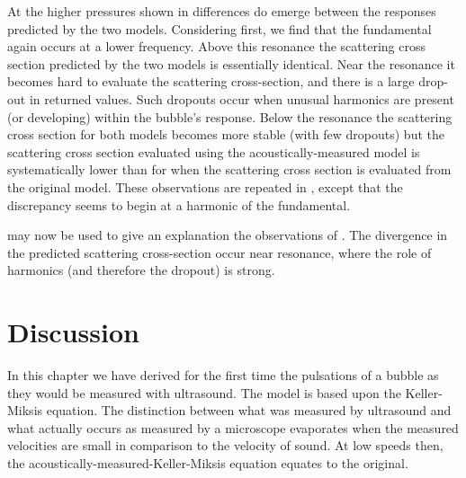 At the higher pressures shown in  differences do emerge between the responses predicted by the two models.
Considering   first, 
we find that the fundamental again occurs at a lower frequency.
Above this resonance the scattering cross section predicted by the two models is essentially identical.
Near the resonance it becomes  hard to evaluate the scattering cross-section, and there is a large drop-out in returned values.
Such dropouts occur when unusual harmonics are present (or developing) within the bubble's response.
Below the resonance the scattering cross section for both models becomes more stable (with few dropouts)
but the scattering cross section evaluated using the acoustically-measured model is systematically 
lower than for when the scattering cross section is evaluated from the original model.
These observations are repeated in , except that the discrepancy seems to begin at a harmonic of the fundamental.

 may now be used to give an explanation the observations of .
The divergence in the predicted scattering cross-section occur near resonance, 
where the role of harmonics (and therefore the dropout) is strong.



\section{Discussion}

In this chapter we have derived for the first time the pulsations of a bubble as they would be measured with ultrasound.
The model is based upon the Keller-Miksis equation.
The distinction between what was measured by ultrasound and what actually occurs as measured by a microscope
evaporates when the measured velocities are small in comparison to the velocity of sound.
At low speeds then, the acoustically-measured-Keller-Miksis equation equates to the original.


